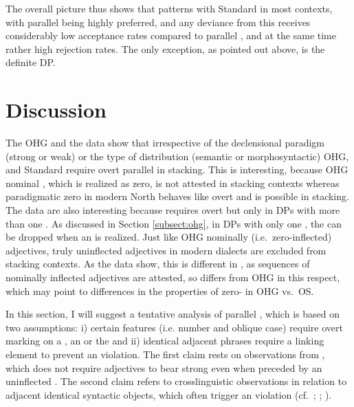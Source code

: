 \documentclass[output=paper,colorlinks,citecolor=brown]{langscibook}
\begin{document}
The overall picture thus shows that  patterns with Standard  in most contexts, with parallel  being highly preferred, and any deviance from this  receives considerably low acceptance rates compared to parallel , and at the same time rather high rejection rates. The only exception, as pointed out above, is the definite  DP.

\section{Discussion}\label{sect:discuss}

The OHG and the  data show that irrespective of the declensional paradigm (strong or weak) or the type of distribution (semantic or morphosyntactic) OHG,  and Standard  require overt parallel  in stacking. This is interesting, because OHG nominal , which is realized as zero, is not attested in stacking contexts whereas paradigmatic zero  in modern North  behaves like overt  and is possible in stacking. The data are also interesting because  requires overt  but only in DPs with more than one . As discussed in Section \ref{subsect:ohg}, in DPs with only one , the  can be dropped when an  is realized. Just like OHG nominally (i.e.~zero-inflected) adjectives, truly uninflected adjectives in modern dialects are excluded from stacking contexts. As the data show, this is different in , as sequences of nominally inflected adjectives are attested, so  differs from OHG in this respect, which may point to differences in the properties of zero- in OHG vs.~OS.

In this section, I will suggest a tentative analysis of parallel , which is based on two assumptions: i) certain features (i.e. number and oblique case) require overt marking on a , an  or the  and ii) identical adjacent phrases require a linking element to prevent an  violation. The first claim rests on observations from , which does not require adjectives to bear strong  even when preceded by an uninflected . The second claim refers to crosslinguistic observations in relation to adjacent identical syntactic objects, which often trigger an  violation (cf.~\citealp{neeleman2017syntactic}; \citealp{nevins2012haplological}; \citealp{richards2010uttering}).
\end{document}
